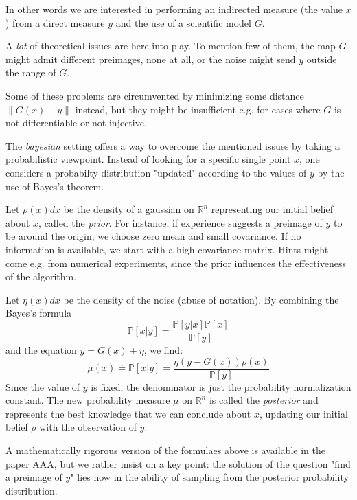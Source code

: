 \documentclass[6pt]{article}
\newcommand{\norm}[1]{\left\lVert#1\right\rVert}
\begin{document}
In other words we are interested in performing an indirected measure
(the value $x$) from a direct measure $y$ and the use of a scientific
model $G$.

A \emph{lot} of theoretical issues are here into play. To mention
few of them, the map $G$ might admit different preimages, none at all,
or the noise might send $y$ outside the range of $G$.

Some of these problems are circumvented by minimizing some distance
$\norm{G(x) - y}$ instead, but they might be
insufficient e.g. for cases where $G$ is not differentiable or not injective.

The \emph{bayesian} setting offers a way to overcome the mentioned issues
by taking a probabilistic viewpoint. Instead of looking for a specific
single point $x$, one considers a probabilty distribution "updated"
 according to the values of $y$ by the use of Bayes's theorem.

Let $\rho(x)dx$ be the density of a gaussian 
on $\mathbb{R}^n$ representing our initial belief
about $x$, called the \emph{prior}. 
For instance, if experience suggests a preimage of $y$ 
to be around the origin, we choose zero mean and small covariance.
If no information is available, we start with a high-covariance matrix.
Hints might come e.g. from numerical experiments, since
the prior influences the effectiveness of the algorithm.

Let $\eta(x)dx$ be the density of the noise (abuse of notation).
By combining the Bayes's formula
\begin{equation}
\mathbb{P}[x | y] = \frac{ \mathbb{P}[y | x] \mathbb{P}[x]} {\mathbb{P}[y]}
\end{equation}
and the equation $y = G(x) + \eta$, we find:
\begin{equation}
\mu (x) \doteq \mathbb{P}[x|y] = \frac{ \eta(y - G(x)) \rho(x)} {\mathbb{P}[y]}
\end{equation}
Since the value of $y$ is fixed, the denominator is just
the probability normalization constant. The new probability measure
$\mu$ on $\mathbb{R}^n$ is called the \emph{posterior} and represents
the best knowledge that we can conclude about $x$, updating our initial
belief $\rho$ with the observation of $y$.

A mathematically rigorous version of the formulaes above is available in
the paper AAA, but we rather insist on a key point:
the solution of the question "find a preimage of $y$" lies now in the ability
of sampling from the posterior probability distribution.
\end{document}
